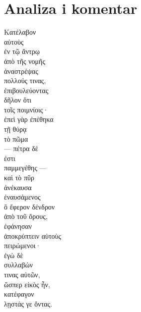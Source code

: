 \section*{Analiza i komentar}



{\large
\begin{greek}
\noindent Κατέλαβον \\
\tabto{2em} αὐτοὺς \\
\tabto{2em} ἐν τῷ ἄντρῳ \\
ἀπὸ τῆς νομῆς \\
ἀναστρέψας \\
\tabto{2em} πολλούς τινας, \\
\tabto{2em} ἐπιβουλεύοντας \\
\tabto{4em} δῆλον ὅτι \\
\tabto{4em} τοῖς ποιμνίοις·\\
ἐπεὶ γὰρ ἐπέθηκα \\
\tabto{2em} τῇ θύρᾳ \\
\tabto{2em} τὸ πῶμα\\
— πέτρα δέ \\
ἐστι \\
\tabto{2em} παμμεγέθης —\\
καὶ τὸ πῦρ \\
ἀνέκαυσα \\
\tabto{2em} ἐναυσάμενος \\
\tabto{4em} ὃ ἔφερον δένδρον \\
\tabto{6em} ἀπὸ τοῦ ὄρους, \\
ἐφάνησαν \\
\tabto{2em} ἀποκρύπτειν αὑτοὺς \\
\tabto{2em} πειρώμενοι·\\
ἐγὼ δὲ \\
\tabto{2em} συλλαβών \\
\tabto{4em} τινας αὐτῶν, \\
ὥσπερ εἰκὸς ἦν, \\
κατέφαγον \\
\tabto{2em} λῃστάς γε ὄντας.\\

\end{greek}
}

